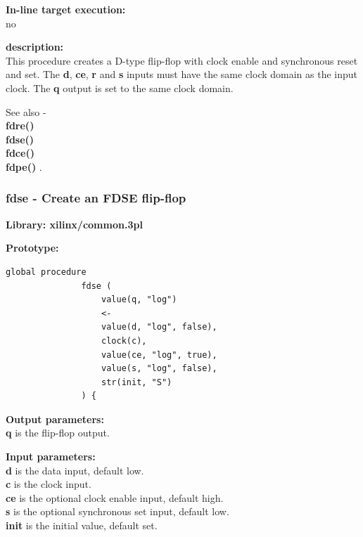             {\bf In-line target execution:} \\
            no

            {\bf description:} \\
            This procedure creates a D-type flip-flop with clock enable and
            synchronous reset and set. The {\bf d}, {\bf ce}, {\bf r} and {\bf
            s} inputs must have the same clock domain as the input clock. The
            {\bf q} output is set to the same clock domain.
            
            See also - \\
            {\bf fdre()} \\
            {\bf fdse()} \\
            {\bf fdce()} \\
            {\bf fdpe()} .




        \subsubsection{fdse - Create an FDSE flip-flop}\label{sec:lpfdse}
            
            {\bf Library: xilinx/common.3pl}

            {\bf Prototype:} \\
            \vsp
            \begin{lstlisting}[gobble=12, language=threepl]
               global procedure
               fdse (
                   value(q, "log")
                   <-
                   value(d, "log", false),
                   clock(c),
                   value(ce, "log", true),
                   value(s, "log", false),
                   str(init, "S")
               ) {
            \end{lstlisting}

            {\bf Output parameters:} \\
            {\bf q} is the flip-flop output.

            {\bf Input parameters:} \\            
            {\bf d} is the data input, default low.\\
            {\bf c} is the clock input.\\
            {\bf ce} is the optional clock enable input, default high.\\
            {\bf s} is the optional synchronous set input, default low. \\
            {\bf init} is the initial value, default set.
        
